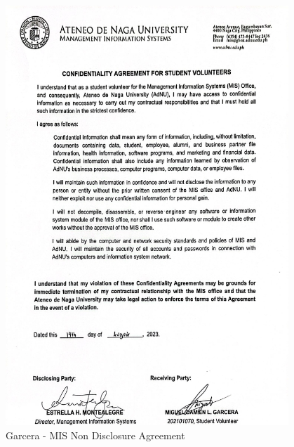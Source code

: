 \begin{figure}[H]
    \centering
    \includegraphics[width=0.95\textwidth]{figures/images/nda/mis-nda-garcera.JPG}
    \caption{Garcera - MIS Non Disclosure Agreement}
    \label{fig:mis-nda-garcera}
\end{figure}

